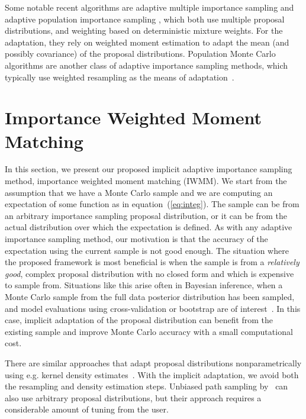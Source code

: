 \documentclass[12pt]{article}
\begin{document}
Some notable recent algorithms are adaptive multiple importance sampling \citep[AMIS; ][]{cornuet2012adaptive}
and adaptive population importance sampling \citep[APIS; ][]{martino2015adaptive}, which both use
multiple proposal distributions, and weighting based on deterministic mixture weights.
For the adaptation, they rely on weighted moment estimation to adapt
the mean (and possibly covariance) of the proposal distributions.
Population Monte Carlo algorithms are another class of adaptive importance sampling methods, which
typically use weighted resampling as the means of adaptation~\citep{cappe2004population,cappe2008adaptive,elvira2017improving}.









%

\section{Importance Weighted Moment Matching} \label{sec:trans}

In this section, we present our proposed implicit adaptive importance sampling method,
importance weighted moment matching (IWMM).
We start from the assumption that we have a Monte Carlo sample and
we are computing an expectation of some function as in equation~(\ref{eq:integ}). The sample can be from an arbitrary importance sampling
proposal distribution, or it can be from the actual distribution over which the expectation is defined.
As with any adaptive importance sampling method, our motivation is that the accuracy of the expectation using the
current sample is not good enough.
The situation where the proposed framework is most beneficial is when
the sample is from a \emph{relatively good}, complex proposal distribution with no closed form and which is expensive to sample from.
%
%
Situations like this arise often in Bayesian inference, when a Monte Carlo sample from the
full data posterior distribution has been sampled, and model
evaluations using cross-validation or bootstrap are of interest~\citep{gelfand1992model,gelfand1996model,peruggia1997variability,epifani2008case,vehtari2017practical,giordano2019swiss}.
In this case, implicit adaptation of the proposal distribution can benefit from the existing sample and
improve Monte Carlo accuracy with a small computational cost.


There are similar approaches that adapt proposal distributions nonparametrically using e.g. kernel density estimates~\citep{zhang1996nonparametric}. With the implicit adaptation, we avoid both the resampling and density estimation steps.
Unbiased path sampling by~\citet{rischard2018unbiased} can also use arbitrary proposal distributions, but their approach
requires a considerable amount of tuning from the user.
\end{document}

